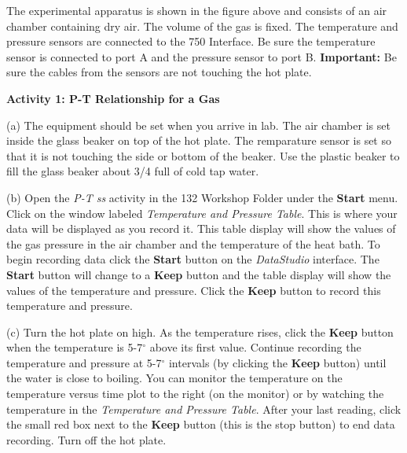 The experimental apparatus is shown in the figure above and consists
of an air chamber containing dry air. The volume of the gas is fixed. 
The temperature and pressure sensors are connected to the 750 Interface. 
Be sure the temperature sensor is connected to port A and the pressure sensor 
to port B. \textbf{Important:} Be sure the cables from the sensors are not touching the hot 
plate.

\textbf{Activity 1: P-T Relationship for a Gas}


(a) The equipment should be set when you arrive in lab. The air chamber is set 
inside the glass beaker on top of the hot plate. The remparature sensor is set 
so that it is not touching the side or bottom of the beaker. Use the plastic 
beaker to fill the glass beaker about 3/4 full of cold tap water.

(b) Open the {\it P-T ss} activity in the 132 Workshop Folder under the
{\bf Start} menu.
Click on the window labeled \textit{Temperature and Pressure Table}. 
This is where your data will be displayed as you record
it. This table display will show the values of the gas pressure in the air 
chamber and the temperature of the heat bath. 
To begin recording data click
the {\bf Start} button on the {\it DataStudio} interface. 
The {\bf Start} button will change to a {\bf Keep} button and the table
display will show the values of the temperature and pressure. 
Click the {\bf Keep} button to record this temperature and pressure.

(c) Turn the hot plate on high.  As the temperature rises, click the {\bf Keep} button when the temperature is 5-7\( ^{\circ } \) above its first value.  Continue recording the temperature and pressure at 5-7\( ^{\circ } \) intervals (by clicking the {\bf Keep} button) until the water is close to boiling.  You can monitor the temperature on the temperature versus time plot to the right (on the monitor) or by watching the temperature in the \textit{Temperature and Pressure Table}.  After your last reading, click the small red box next to the {\bf Keep} button (this is the stop button) to end data recording. Turn off the hot plate.

